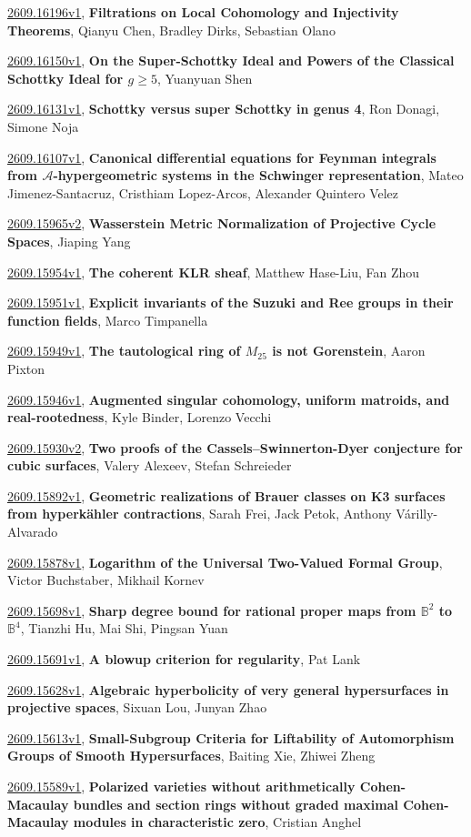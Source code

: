 \documentclass[9pt, a4paper]{article}
\theoremstyle{plain}
\theoremstyle{definition}
\theoremstyle{remark}
\newcommand{\arxiv}[3]{\href{https://arxiv.org/abs/#1}{#1}, \textbf{\textcolor{arxivblue}{#2}}, #3}
\begin{document}
\arxiv{2609.16196v1}{Filtrations on Local Cohomology and Injectivity Theorems}{Qianyu Chen, Bradley Dirks, Sebastian Olano}

\arxiv{2609.16150v1}{On the Super-Schottky Ideal and Powers of the Classical Schottky Ideal for $g \geq 5$}{Yuanyuan Shen}

\arxiv{2609.16131v1}{Schottky versus super Schottky in genus 4}{Ron Donagi, Simone Noja}

\arxiv{2609.16107v1}{Canonical differential equations for Feynman integrals from $\mathcal{A}$-hypergeometric systems in the Schwinger representation}{Mateo Jimenez-Santacruz, Cristhiam Lopez-Arcos, Alexander Quintero Velez}

\arxiv{2609.15965v2}{Wasserstein Metric Normalization of Projective Cycle Spaces}{Jiaping Yang}

\arxiv{2609.15954v1}{The coherent KLR sheaf}{Matthew Hase-Liu, Fan Zhou}

\arxiv{2609.15951v1}{Explicit invariants of the Suzuki and Ree groups in their function fields}{Marco Timpanella}

\arxiv{2609.15949v1}{The tautological ring of $M_{25}$ is not Gorenstein}{Aaron Pixton}

\arxiv{2609.15946v1}{Augmented singular cohomology, uniform matroids, and real-rootedness}{Kyle Binder, Lorenzo Vecchi}

\arxiv{2609.15930v2}{Two proofs of the Cassels--Swinnerton-Dyer conjecture for cubic surfaces}{Valery Alexeev, Stefan Schreieder}

\arxiv{2609.15892v1}{Geometric realizations of Brauer classes on K3 surfaces from hyperkähler contractions}{Sarah Frei, Jack Petok, Anthony Várilly-Alvarado}

\arxiv{2609.15878v1}{Logarithm of the Universal Two-Valued Formal Group}{Victor Buchstaber, Mikhail Kornev}

\arxiv{2609.15698v1}{Sharp degree bound for rational proper maps from $\mathbb B^2$ to $\mathbb B^4$}{Tianzhi Hu, Mai Shi, Pingsan Yuan}

\arxiv{2609.15691v1}{A blowup criterion for regularity}{Pat Lank}

\arxiv{2609.15628v1}{Algebraic hyperbolicity of very general hypersurfaces in projective spaces}{Sixuan Lou, Junyan Zhao}

\arxiv{2609.15613v1}{Small-Subgroup Criteria for Liftability of Automorphism Groups of Smooth Hypersurfaces}{Baiting Xie, Zhiwei Zheng}

\arxiv{2609.15589v1}{Polarized varieties without arithmetically Cohen-Macaulay bundles and section rings without graded maximal Cohen-Macaulay modules in characteristic zero}{Cristian Anghel}
\end{document}
